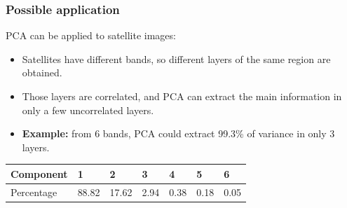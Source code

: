 \documentclass[serif, 12pt]{beamer}
\begin{document}
\begin{frame}
\frametitle{Possible application}

PCA can be applied to satellite images:

\begin{itemize}
\item Satellites have different bands, so different layers of the same region 
are obtained.
\item Those layers are correlated, and PCA can extract the main information in 
only a few uncorrelated layers.
\item \textbf{Example:} from 6 bands, PCA could extract 99.3\% of variance in 
only 3 layers.
\end{itemize}

\begin{tabular}{l l l l l l l}
Component & 1 & 2 & 3 & 4 & 5 & 6 \\
\hline
Percentage & 88.82 & 17.62 & 2.94 & 0.38 & 0.18 & 0.05 \\
\end{tabular}

\end{frame}
\end{document}
